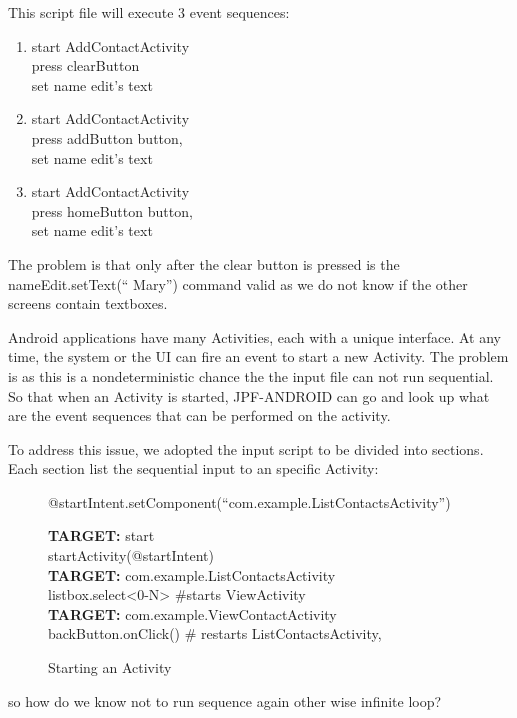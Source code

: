 \documentclass{acm_proc_article-sp}
\begin{document}
This script file will execute 3 event sequences:
\begin{enumerate}
 \item start AddContactActivity\\
press clearButton\\
set name edit's text
 \item start AddContactActivity\\ 
 press addButton button, \\
 set name edit's text
 \item start AddContactActivity\\
 press homeButton button, \\
 set name edit's text
\end{enumerate}

The problem is that only after the clear button is pressed is the nameEdit.setText(`` Mary'') command valid as we do not know if the other
screens contain textboxes.

Android applications have many Activities, each with a unique interface. At any time, the system or the UI can fire an event to start a new
Activity. The problem is as this is a nondeterministic chance the the input file can not run sequential. So that when an Activity is
started, JPF-ANDROID can go and look up what are the event sequences that can be performed on the activity.


To address this issue, we adopted the input script to be divided into sections. Each section list the sequential input to an specific
Activity:




\begin{figure}
{\small
{\sf 
@startIntent.setComponent(``com.example.ListContactsActivity'')

\textbf{TARGET:} start\\
startActivity(@startIntent)\\

\textbf{TARGET:} com.example.ListContactsActivity\\
listbox.select<0-N> \#starts ViewActivity\\

\textbf{TARGET:} com.example.ViewContactActivity\\
backButton.onClick() \# restarts ListContactsActivity, \\
   
}
}
\caption{Starting an Activity}
\end{figure}
so how do we know not to run sequence again other wise infinite loop?
\end{document}
